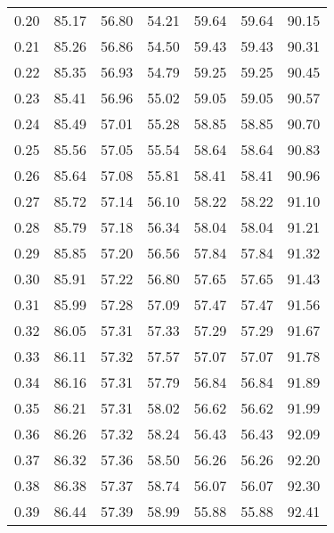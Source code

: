 \begin{tabular}{|c|c|c|c|c|c|c|}
      0.20 &     85.17 &     56.80 &      54.21 &   59.64 &      59.64 &         90.15 \\
      0.21 &     85.26 &     56.86 &      54.50 &   59.43 &      59.43 &         90.31 \\
      0.22 &     85.35 &     56.93 &      54.79 &   59.25 &      59.25 &         90.45 \\
      0.23 &     85.41 &     56.96 &      55.02 &   59.05 &      59.05 &         90.57 \\
      0.24 &     85.49 &     57.01 &      55.28 &   58.85 &      58.85 &         90.70 \\
      0.25 &     85.56 &     57.05 &      55.54 &   58.64 &      58.64 &         90.83 \\
      0.26 &     85.64 &     57.08 &      55.81 &   58.41 &      58.41 &         90.96 \\
      0.27 &     85.72 &     57.14 &      56.10 &   58.22 &      58.22 &         91.10 \\
      0.28 &     85.79 &     57.18 &      56.34 &   58.04 &      58.04 &         91.21 \\
      0.29 &     85.85 &     57.20 &      56.56 &   57.84 &      57.84 &         91.32 \\
      0.30 &     85.91 &     57.22 &      56.80 &   57.65 &      57.65 &         91.43 \\
      0.31 &     85.99 &     57.28 &      57.09 &   57.47 &      57.47 &         91.56 \\
      0.32 &     86.05 &     57.31 &      57.33 &   57.29 &      57.29 &         91.67 \\
      0.33 &     86.11 &     57.32 &      57.57 &   57.07 &      57.07 &         91.78 \\
      0.34 &     86.16 &     57.31 &      57.79 &   56.84 &      56.84 &         91.89 \\
      0.35 &     86.21 &     57.31 &      58.02 &   56.62 &      56.62 &         91.99 \\
      0.36 &     86.26 &     57.32 &      58.24 &   56.43 &      56.43 &         92.09 \\
      0.37 &     86.32 &     57.36 &      58.50 &   56.26 &      56.26 &         92.20 \\
      0.38 &     86.38 &     57.37 &      58.74 &   56.07 &      56.07 &         92.30 \\
      0.39 &     86.44 &     57.39 &      58.99 &   55.88 &      55.88 &         92.41 \\

\end{tabular}
